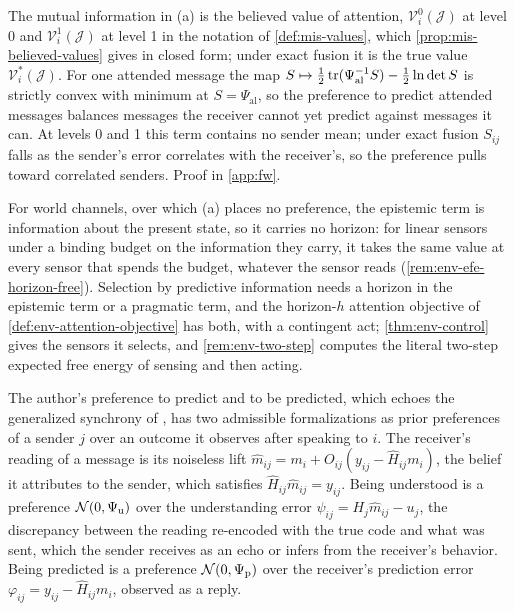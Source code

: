 The mutual information in (a) is the believed value of attention, $\mathcal V^0_i(\mathcal J)$ at level 0 and $\mathcal V^1_i(\mathcal J)$ at level 1 in the notation of \cref{def:mis-values}, which \cref{prop:mis-believed-values} gives in closed form; under exact fusion it is the true value $\mathcal V^\ast_i(\mathcal J)$. For one attended message the map $S\mapsto\tfrac12\operatorname{tr}(\Psi_{\mathrm{al}}^{-1}S)-\tfrac12\ln\det S$ is strictly convex with minimum at $S=\Psi_{\mathrm{al}}$, so the preference to predict attended messages balances messages the receiver cannot yet predict against messages it can. At levels 0 and 1 this term contains no sender mean; under exact fusion $S_{ij}$ falls as the sender's error correlates with the receiver's, so the preference pulls toward correlated senders. Proof in \cref{app:fw}.

For world channels, over which (a) places no preference, the epistemic term is information about the present state, so it carries no horizon: for linear sensors under a binding budget on the information they carry, it takes the same value at every sensor that spends the budget, whatever the sensor reads (\cref{rem:env-efe-horizon-free}). Selection by predictive information needs a horizon in the epistemic term or a pragmatic term, and the horizon-$h$ attention objective of \cref{def:env-attention-objective} has both, with a contingent act; \cref{thm:env-control} gives the sensors it selects, and \cref{rem:env-two-step} computes the literal two-step expected free energy of sensing and then acting.

The author's preference to predict and to be predicted, which echoes the generalized synchrony of \citet{friston2015duet}, has two admissible formalizations as prior preferences of a sender $j$ over an outcome it observes after speaking to $i$. The receiver's reading of a message is its noiseless lift $\hat m_{ij}=m_i+O_{ij}(y_{ij}-\hat H_{ij}m_i)$, the belief it attributes to the sender, which satisfies $\hat H_{ij}\hat m_{ij}=y_{ij}$. Being understood is a preference $\mathcal{N}(0,\Psi_{\mathrm u})$ over the understanding error $\psi_{ij}=H_j\hat m_{ij}-u_j$, the discrepancy between the reading re-encoded with the true code and what was sent, which the sender receives as an echo or infers from the receiver's behavior. Being predicted is a preference $\mathcal{N}(0,\Psi_{\mathrm p})$ over the receiver's prediction error $\varphi_{ij}=y_{ij}-\hat H_{ij}m_i$, observed as a reply.

